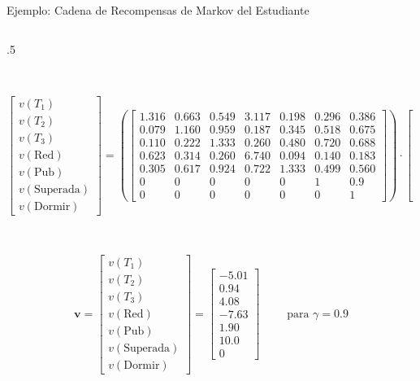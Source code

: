 \documentclass[10pt, envcountsect, handout, aspectratio=1610, hyperref={hypertexnames=true}]{beamer}
\begin{document}
\begin{frame}{Ejemplo: Cadena de Recompensas de Markov del Estudiante}
\begin{columns}
\begin{column}{.5\textwidth}
~

~

$
\begin{bmatrix}
v(T_1) \\
v(T_2) \\
v(T_3) \\
v(\text{Red}) \\
v(\text{Pub}) \\
v(\text{Superada}) \\
v(\text{Dormir})
\end{bmatrix}
=
\left(
\begin{bmatrix}
1.316 & 0.663 & 0.549 & 3.117 & 0.198 & 0.296 & 0.386 \\
0.079 & 1.160 & 0.959 & 0.187 & 0.345 & 0.518 & 0.675 \\
0.110 & 0.222 & 1.333 & 0.260 & 0.480 & 0.720 & 0.688 \\
0.623 & 0.314 & 0.260 & 6.740 & 0.094 & 0.140 & 0.183 \\
0.305 & 0.617 & 0.924 & 0.722 & 1.333 & 0.499 & 0.560 \\
0     & 0     & 0     & 0     & 0     & 1     & 0.9   \\
0     & 0     & 0     & 0     & 0     & 0     & 1
\end{bmatrix}
\right)
\cdot
\begin{bmatrix}
-2 \\
-2 \\
-2 \\
-1 \\
1 \\
10 \\
0
\end{bmatrix}
$

~

\scriptsize

\[
\mathbf{v} = \begin{bmatrix}
v(T_1) \\
v(T_2) \\
v(T_3) \\
v(\text{Red}) \\
v(\text{Pub}) \\
v(\text{Superada}) \\
v(\text{Dormir})
\end{bmatrix}
= \begin{bmatrix}
-5.01 \\
0.94 \\
4.08 \\
-7.63 \\
1.90 \\
10.0 \\
0
\end{bmatrix}
\qquad \text{ para } \gamma = 0.9\]



\end{column}


\end{columns}

\end{frame}
\end{document}
